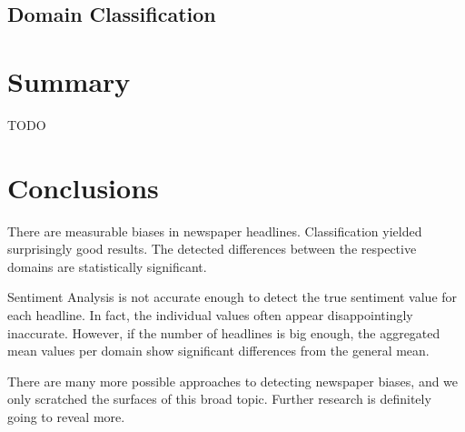 \documentclass[final]{ieee}
\begin{document}
\subsection{Domain Classification}
            
\section{Summary}\label{sec:summary}
TODO

\section{Conclusions}\label{sec:conclusions}
There are measurable biases in newspaper headlines. Classification yielded surprisingly good results. The detected differences between the respective domains are statistically significant.

Sentiment Analysis is not accurate enough to detect the true sentiment value for each headline. In fact, the individual values often appear disappointingly inaccurate. However, if the number of headlines is big enough, the aggregated mean values per domain show significant differences from the general mean.

There are many more possible approaches to detecting newspaper biases, and we only scratched the surfaces of this broad topic. Further research is definitely going to reveal more. %



           
\end{document}
